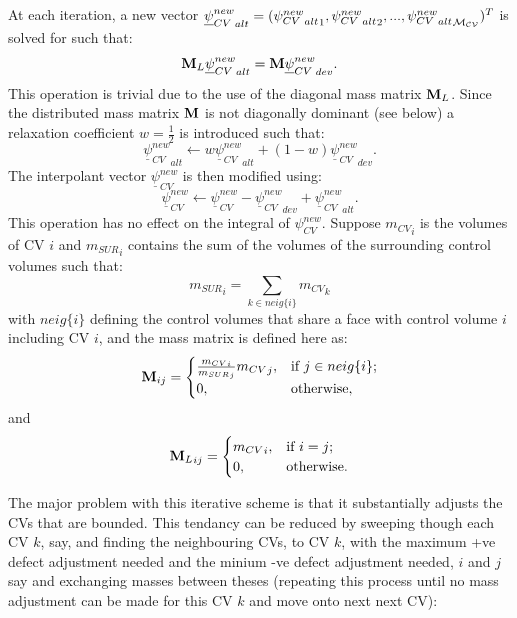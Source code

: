 At each iteration, a new vector ${\underline\psi_{CV}^{new}}_{alt} =( {{\psi_{CV}^{new}}_{alt}}_1,{{\psi_{CV}^{new}}_{alt}}_2, ...,  {{\psi_{CV}^{new}}_{alt}}_{\cal M_{CV}})^T$ is solved for such that:
\begin{equation}
{\bf M}_L {\underline\psi_{CV}^{new}}_{alt} = {\bf M} {\underline\psi_{CV}^{new}}_{dev} .
\label{q_alt}
\end{equation}
This operation is trivial due to the use of the diagonal mass matrix ${\bf M}_L$.
Since the distributed mass matrix $\bf M$ is not diagonally dominant (see below)
a relaxation coefficient $w=\frac{1}{2}$ is introduced such that:
\begin{equation}
{\underline\psi_{CV}^{new}}_{alt} \leftarrow w {\underline\psi_{CV}^{new}}_{alt}+(1-w) {\underline\psi_{CV}^{new}}_{dev}.
\label{q_alt_relax}
\end{equation}
The interpolant vector $\underline\psi_{CV}^{new}$ is then modified using:
\begin{equation}
\underline\psi_{CV}^{new} \leftarrow \underline\psi_{CV}^{new} - {\underline\psi_{CV}^{new}}_{dev} + {\underline\psi_{CV}^{new}}_{alt} .
\label{q_update}
\end{equation}
This operation has no effect on the integral of $\psi_{CV}^{new}$.
Suppose ${m_{CV}}_i$ is the volumes of CV $i$
and ${m_{SUR}}_i$ contains the sum of the volumes of the surrounding control volumes such that:
\begin{equation}
{m_{SUR}}_i = \sum_{k\in neig\{i\}} {m_{CV}}_k
\label{m_sur}
\end{equation}
with $neig\{i\}$ defining the control volumes that share a face with control volume $i$ including CV $i$,
and the
mass matrix is defined here as:
\begin{equation}
{\bf M}_{ij} =
  \begin{cases}
   \frac{  {m_{CV}}_i }{ {m_{SUR}}_j} {m_{CV}}_j, & \text{if} \
    j\in neig\{i\}; \\
    0,  & \text{otherwise},
  \end{cases}
\label{M-def}
\end{equation}
and
\begin{equation}
{{\bf M}_L}_{ij} =
  \begin{cases}
   {m_{CV}}_i, & \text{if} \
    i=j ; \\
    0,  & \text{otherwise}.
  \end{cases}
\label{ML-def}
\end{equation}

The major problem with this iterative scheme is that it substantially adjusts the CVs
that are bounded. This tendancy can be reduced by sweeping though each CV $k$, say,
and finding the neighbouring CVs, to CV $k$, with the maximum +ve defect adjustment needed and
the minium -ve defect adjustment needed, $i$ and $j$ say and exchanging masses between theses
(repeating this process until no mass adjustment can be made for this CV $k$ and
move onto next next CV):

